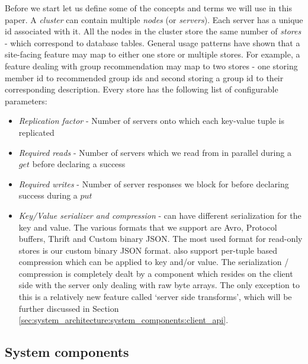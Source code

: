 \documentclass[10pt,twocolumn,preprint,natbib,authoryear]{sigplanconf}
\begin{document}
Before we start let us define some of the concepts and terms we will use in this paper. A \projectname{} \emph{cluster} can contain multiple \emph{nodes} (or \emph{servers}). Each server has a unique id associated with it. All the nodes in the cluster store the same number of \emph{stores} - which correspond to database tables. General usage patterns have shown that a site-facing feature may map to either one store or multiple stores. For example, a feature dealing with group recommendation may map to two stores - one storing member id to recommended group ids and second storing a group id to their corresponding description. Every store has the following list of configurable parameters:
\begin{itemize}
	\item \emph {Replication factor} - Number of servers onto which each key-value tuple is replicated
	\item \emph {Required reads} - Number of servers which we read from in parallel during a $get$ before declaring a success
	\item \emph {Required writes} - Number of server responses we block for before declaring success during a $put$
	\item \emph {Key/Value serializer and compression} - \projectname{} can have different serialization for the key and value. The various formats that we support are Avro, Protocol buffers, Thrift and Custom binary JSON. The most used format for read-only stores is our custom binary JSON format. \projectname{} also support per-tuple based compression which can be applied to key and/or value. The serialization / compression is completely dealt by a component which resides on the client side with the server only dealing with raw byte arrays. The only exception to this is a relatively new feature called `server side transforms', which will be further discussed in Section \ref{sec:system_architecture:system_components:client_api}. 
\end{itemize}



\subsection{System components}
\label{sec:system_architecture:system_components}
\end{document}
